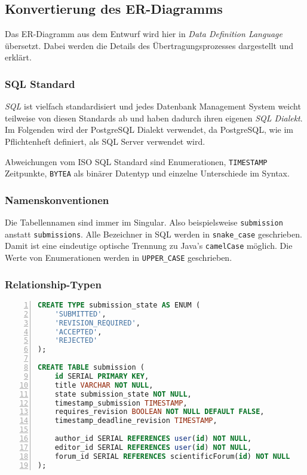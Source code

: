
\subsection{Konvertierung des ER-Diagramms}

Das ER-Diagramm aus dem Entwurf wird hier in \emph{Data Definition Language} übersetzt. Dabei werden die Details des Übertragungsprozesses dargestellt und erklärt.

\subsubsection{SQL Standard}

\emph{SQL} ist vielfach standardisiert und jedes Datenbank Management System weicht teilweise von diesen Standards ab und haben dadurch ihren eigenen \emph{SQL Dialekt}. Im Folgenden wird der PostgreSQL Dialekt verwendet, da PostgreSQL, wie im Pflichtenheft definiert, als SQL Server verwendet wird.

Abweichungen vom ISO SQL Standard sind Enumerationen, \texttt{TIMESTAMP} Zeitpunkte, \texttt{BYTEA} als binärer Datentyp und einzelne Unterschiede im Syntax.

\subsubsection{Namenskonventionen}

Die Tabellennamen sind immer im Singular. Also beispielsweise \texttt{submission} anstatt \texttt{submissions}.
Alle Bezeichner in SQL werden in \texttt{snake\_case} geschrieben. Damit ist eine eindeutige optische Trennung zu Java's \texttt{camelCase} möglich. Die Werte von Enumerationen werden in \texttt{UPPER\_CASE} geschrieben.

\subsubsection{Relationship-Typen}

\begin{lstlisting}[language=SQL, caption={DDL von Einreichungen},captionpos=below,frame=tb,numbers=left, tabsize=4]
CREATE TYPE submission_state AS ENUM (
	'SUBMITTED',
	'REVISION_REQUIRED',
	'ACCEPTED',
	'REJECTED'
);

CREATE TABLE submission (
	id SERIAL PRIMARY KEY,
	title VARCHAR NOT NULL,
	state submission_state NOT NULL,
	timestamp_submission TIMESTAMP,
	requires_revision BOOLEAN NOT NULL DEFAULT FALSE,
	timestamp_deadline_revision TIMESTAMP,

	author_id SERIAL REFERENCES user(id) NOT NULL,
	editor_id SERIAL REFERENCES user(id) NOT NULL,
	forum_id SERIAL REFERENCES scientificForum(id) NOT NULL
);
\end{lstlisting}